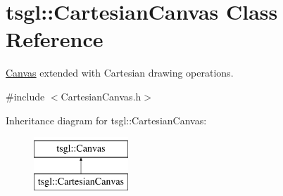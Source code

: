 \hypertarget{classtsgl_1_1_cartesian_canvas}{}\section{tsgl\+:\+:Cartesian\+Canvas Class Reference}
\label{classtsgl_1_1_cartesian_canvas}


\hyperlink{classtsgl_1_1_canvas}{Canvas} extended with Cartesian drawing operations.  




{\ttfamily \#include $<$Cartesian\+Canvas.\+h$>$}

Inheritance diagram for tsgl\+:\+:Cartesian\+Canvas\+:\begin{figure}[H]
\begin{center}
\leavevmode
\includegraphics[height=2.000000cm]{classtsgl_1_1_cartesian_canvas}
\end{center}
\end{figure}
